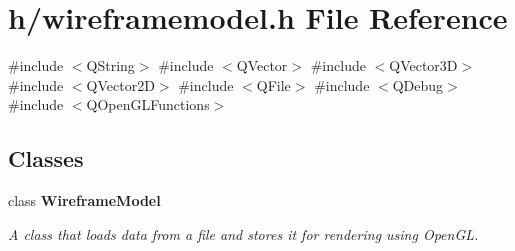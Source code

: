 \section{h/wireframemodel.h File Reference}
\label{wireframemodel_8h}
{\ttfamily \#include $<$Q\+String$>$}\newline
{\ttfamily \#include $<$Q\+Vector$>$}\newline
{\ttfamily \#include $<$Q\+Vector3D$>$}\newline
{\ttfamily \#include $<$Q\+Vector2D$>$}\newline
{\ttfamily \#include $<$Q\+File$>$}\newline
{\ttfamily \#include $<$Q\+Debug$>$}\newline
{\ttfamily \#include $<$Q\+Open\+G\+L\+Functions$>$}\newline
\subsection*{Classes}
\begin{DoxyCompactItemize}
\item 
class \textbf{ Wireframe\+Model}
\begin{DoxyCompactList}\small\item\em A class that loads data from a file and stores it for rendering using Open\+GL. \end{DoxyCompactList}\end{DoxyCompactItemize}
